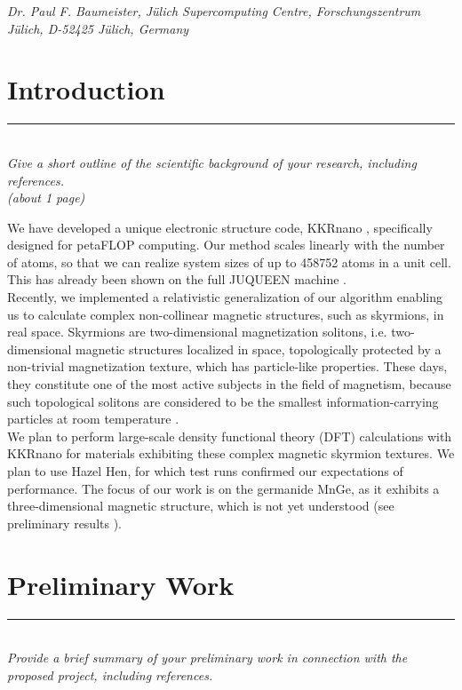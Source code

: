 \documentclass [a4paper, 12pt]{article}
\begin{document}
\phantom{MM} \textit{Dr. Paul F. Baumeister,
J\"ulich Supercomputing Centre, Forschungszentrum J\"ulich, D-52425 J\"ulich, Germany
}


\newpage

\vfill
\tableofcontents
\vfill

\newpage



\section{Introduction}
\rule{\textwidth}{0.4pt}\\
\textit{Give a short outline of the scientific background of your research, including references.}\\

\textit{(about 1 page)}

We have developed a unique electronic structure code, 
KKRnano \cite{zeller_towards_2008,thiess_massively_2012},
specifically designed for petaFLOP computing. Our method scales linearly
with the number of atoms, so that we can realize system sizes of up to 
458752 atoms in a unit cell. This has already been shown on the full JUQUEEN
machine \cite{brommel_juqueen_2017}.
\\
Recently, we implemented a relativistic generalization of our algorithm 
enabling us to calculate complex non-collinear magnetic structures, such as skyrmions,
in real space. Skyrmions are two-dimensional magnetization solitons, i.e. two-dimensional
magnetic structures localized in space, topologically protected by a non-trivial
magnetization texture, which has particle-like properties. 
These days, they constitute one of the most active subjects in the field of 
magnetism, because such topological solitons are considered to be the smallest 
information-carrying particles at room temperature \cite{fert_skyrmions_2013,castelvecchi_strange_2017}. 
\\
We plan to perform large-scale density functional theory (DFT) calculations with 
KKRnano for materials exhibiting these complex magnetic skyrmion textures. We plan to use Hazel Hen, 
for which test runs confirmed our expectations of performance. 
The focus of our work is on the germanide MnGe, as it exhibits a three-dimensional magnetic structure,
which is not yet understood (see preliminary results
\cite{tanigaki_real-space_2015,bornemann_investigation_2017}).

\section{Preliminary Work}
\rule{\textwidth}{0.4pt}\\
\textit{Provide a brief summary of your preliminary work in connection with the proposed project, including references.}\\
\end{document}
